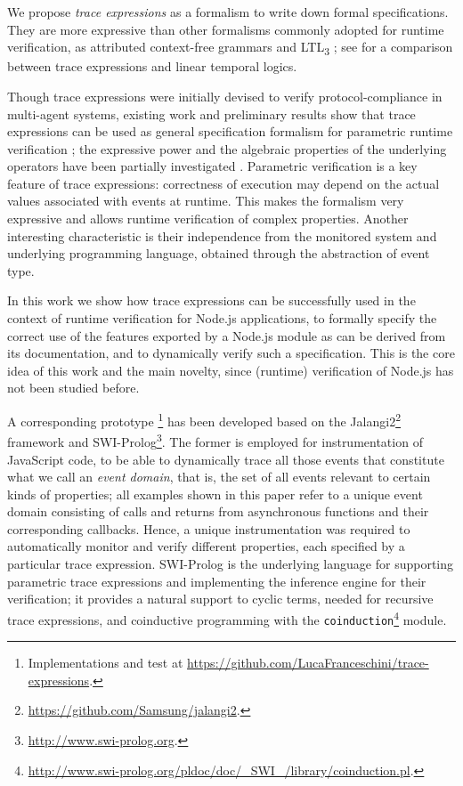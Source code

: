 We propose \emph{trace expressions} \cite{ancona2016comparing} as a formalism to write down formal specifications.
They are more expressive than other formalisms commonly adopted for runtime verification, as
attributed context-free grammars \cite{de2014combining} and LTL\textsubscript{3} \cite{ltl3}; see \cite{AnconaFM16} for a comparison between trace expressions and linear temporal logics.

Though trace expressions were initially devised to verify protocol-compliance in multi-agent systems, existing work and preliminary results show that trace expressions can be used as general specification formalism for parametric runtime verification \cite{ParametricJava17, TowardsIoT17};
the expressive power and the algebraic properties of the underlying operators have been partially investigated \cite{ParametricJava17,ancona2016comparing}.
Parametric verification is a key feature of trace expressions: correctness of execution may depend on the actual values associated with events at runtime.
This makes the formalism very expressive and allows runtime verification of complex properties.
Another interesting characteristic is their independence from the monitored system and underlying programming language,
obtained through the abstraction of event type.

In this work we show how trace expressions can be successfully used in the context of runtime verification for
Node.js applications, to formally specify the correct use of the features exported by a Node.js module as
can be derived from its documentation, and to dynamically verify such a specification.
This is the core idea of this work and the main novelty, since (runtime) verification of Node.js has not been studied before.

A corresponding prototype
\footnote{Implementations and test at \url{https://github.com/LucaFranceschini/trace-expressions}.}
has been developed based on the Jalangi2\footnote{\url{https://github.com/Samsung/jalangi2}.}
framework and SWI-Prolog\footnote{\url{http://www.swi-prolog.org}.}.
The former is employed for instrumentation of JavaScript code, to be able
to dynamically trace all those events that constitute what we call an \emph{event domain}, that is, the set
of all events relevant to certain kinds of properties;
all examples shown in this paper refer to a unique event domain consisting of calls and returns
from asynchronous functions and their corresponding callbacks. Hence, a unique instrumentation
was required to automatically monitor and verify different properties, each specified by a particular trace expression.
SWI-Prolog is the underlying language for supporting parametric
trace expressions and implementing the inference engine for their verification; it provides
a natural support to cyclic terms, needed for recursive trace expressions, and coinductive
programming with the \lstinline{coinduction}\footnote{\url{http://www.swi-prolog.org/pldoc/doc/_SWI_/library/coinduction.pl}.}
module. 

